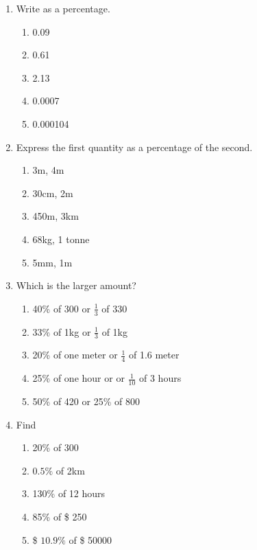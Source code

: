 \documentclass[fleqn, a4paper, 11pt]{article}
\begin{document}
\begin{enumerate}
	\item Write as a percentage.
	      \begin{enumerate}[itemsep=0.7in]
		      \item 0.09
		      \item 0.61
		      \item 2.13
		      \item 0.0007
		      \item 0.000104

	      \end{enumerate}
	      \vspace{1in}

	\item Express the first quantity as a percentage of the second.
	      \begin{enumerate}[itemsep=0.7in]
		      \item 3m, 4m
		      \item 30cm, 2m
		      \item 450m, 3km
		      \item 68kg, 1 tonne
		      \item 5mm, 1m
	      \end{enumerate}
	      \vspace{1in}
	      \newpage

	\item Which is the larger amount?
	      \begin{enumerate}[itemsep=0.7in]
		      \item 40\% of 300 or $\frac{1}{3}$ of 330
		      \item 33\% of 1kg or $\frac{1}{3}$ of 1kg
		      \item 20\% of one meter or $\frac{1}{4}$ of 1.6 meter
		      \item 25\% of one hour or or $\frac{1}{10}$ of 3 hours
		      \item 50\% of 420 or 25\% of 800

	      \end{enumerate}
	      \vspace{1in}

	\item Find
	      \begin{enumerate}[itemsep=0.7in]
		      \item 20\% of 300
		      \item $0.5\%$ of 2km
		      \item 130\% of 12 hours
		      \item 85\% of \$ 250
		      \item \$ $10.9\%$ of \$ 50000


\end{enumerate}
\end{enumerate}
\end{document}
